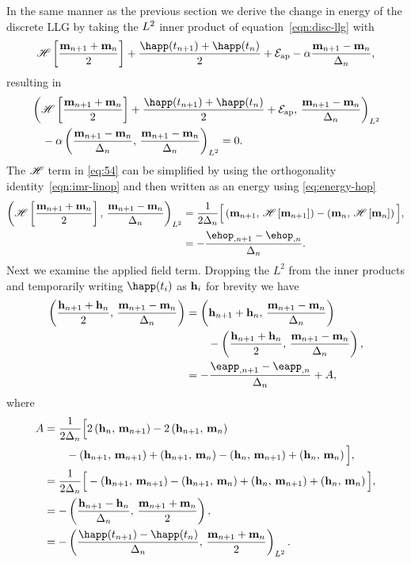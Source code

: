 In the same manner as the previous section we derive the change in energy of the discrete LLG by taking the $L^2$ inner product of equation~\cref{eqn:disc-llg} with
\begin{equation}
  \mphop + \frac{\happ(t_{n+1}) + \happ(t_n)}{2} + \happerror - \dampc \mpdmdt,
\end{equation}
resulting in
\begin{equation}
  \begin{aligned}
    &\ltip{\mphop + \frac{\happ(t_{n+1}) + \happ(t_n)}{2} + \happerror}{\mpdmdt} \\
    & \quad - \dampc \ltip{\mpdmdt}{\mpdmdt} = 0.
    \label{eq:54}
  \end{aligned}
\end{equation}
The $\mathscr{H}$ term in \cref{eq:54} can be simplified by using the orthogonality identity~\cref{eqn:imr-linop} and then written as an energy using \cref{eq:energy-hop}
\begin{equation}
  \begin{aligned}
    \ltip{\mphop}{\mpdmdt} 
    &= \frac{1}{2\dtn} \Big[\ip{\mv_{n+1}}{\hop \left[\mv_{n+1} \right]}
    - \ip{\mv_{n}}{ \hop\left[ \mv_{n} \right]} \Big], \\
    &= -\frac{\ehop_{,n+1} - \ehop_{,n}}{\dtn}.
  \end{aligned}
  \label{eq:50}
\end{equation}
Next we examine the applied field term.
Dropping the $L^2$ from the inner products and temporarily writing $\happ(t_i)$ as $\mathbf{h}_i$ for brevity we have
\begin{equation}
  \begin{aligned}
    \ip{\frac{\hv_{n+1} + \hv_n}{2}}{\mpdmdt}
    &= \ip{\hv_{n+1} + \hv_n}{\mpdmdt} \\
    & \qquad - \ip{\frac{\hv_{n+1} + \hv_n}{2}}{\mpdmdt}, \\
    &= -\frac{\eapp_{, n+1} - \eapp_{, n}}{\dtn}  + A,
  \end{aligned}
\end{equation}
where
\begin{equation}
  \begin{aligned}
    A &= \frac{1}{2\dtn}\Big[ 2\ip{\hv_n}{\mv_{n+1}} - 2\ip{\hv_{n+1}}{\mv_n} \\
    & \qquad - \ip{\hv_{n+1}}{\mv_{n+1}} +\ip{\hv_{n+1}}{\mv_n} 
    - \ip{\hv_n}{\mv_{n+1}} + \ip{\hv_n}{\mv_n} \Big], \\
    &= \frac{1}{2\dtn}\Big[ - \ip{\hv_{n+1}}{\mv_{n+1}} - \ip{\hv_{n+1}}{\mv_n} 
    + \ip{\hv_n}{\mv_{n+1}} + \ip{\hv_n}{\mv_n} \Big], \\
    &= - \ip{ \frac{\hv_{n+1} - \hv_n}{\dtn} }{ \frac{\mv_{n+1} + \mv_n}{2} }, \\
    &= - \ltip{ \frac{\happ(t_{n+1}) - \happ(t_n)}{\dtn} }{ \frac{\mv_{n+1} + \mv_n}{2} }.
    \label{eq:52}
  \end{aligned}
\end{equation}
